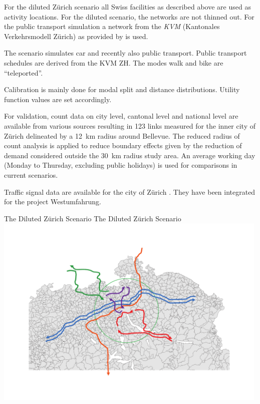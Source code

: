 For the diluted Zürich scenario all Swiss facilities as described above are used as activity locations. For the diluted scenario, the networks are not thinned out. For the public transport simulation a network from the \emph{KVM} (Kantonales Verkehrsmodell Zürich) as provided by \citet[][]{AMV_Webpage_2011} is used. 

The scenario simulates car and recently also public transport. Public transport schedules are derived from the KVM ZH. The modes walk and bike are ``teleported''. 

Calibration is mainly done for modal split and distance distributions. Utility function values are set accordingly.

For validation, count data on city level, cantonal level and national level \citep[][]{ASTRA_Webpage_2006} are available from various sources resulting in 123 links measured for the inner city of Zürich delineated by a 12~km radius around Bellevue. The reduced radius of count analysis is applied to reduce boundary effects given by the reduction of demand considered outside the 30~km radius study area. An average working day (Monday to Thursday, excluding public holidays) is used for comparisons in current scenarios.

Traffic signal data are available for the city of Zürich \citep[][]{STAPOZH-DAV_unpub_gtZH_2008}. They have been integrated for the project Westumfahrung.

\createfigure%
{The Diluted Zürich Scenario}%
{The Diluted Zürich Scenario}%
{\label{fig:zurichScenario}}%
{\includegraphics[width=0.99\textwidth, angle=0]{using/figures/zh.pdf}}%
{}

